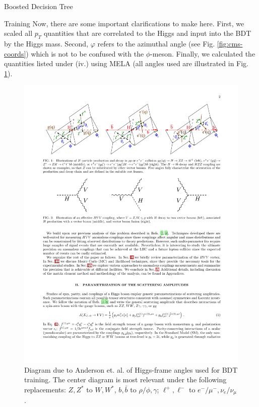 \begin{section}{Boosted Decision Tree}
\begin{subsection}{Training}
\noindent Now, there are some important clarifications to make here. First, we scaled all $p_{T}$ quantities that are correlated to the Higgs and input into the BDT by the Higgs mass. Second, $\varphi$ refers to the azimuthal angle (see Fig. \ref{fig:cms-coords}) which is not to be confused with the $\phi$-meson. Finally, we calculated the quantities listed under (iv.) using MELA\cite{cite-mela} (all angles used are illustrated in Fig. \ref{fig:magic-angles}).

\begin{figure}[htb]
\begin{center}
\includegraphics[width=.95\linewidth]{Dissertation/fig/magic-angles.pdf}
\end{center}
\caption{Diagram due to Anderson et. al. \cite{magic-angles-cite} of Higgs-frame angles used for BDT training. The center diagram is most relevant under the following replacements: $Z, Z^*$ to $W, W^*$, $b, \bar{b}$ to $\rho/\phi, \gamma$; $\ell^+,\ell^-$ to $e^-/\mu^-, \nu_e/ \nu_\mu$.}
\label{fig:magic-angles}
\end{figure}


\end{subsection}
\end{section}
